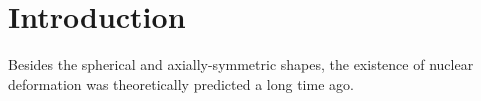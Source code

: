 \chapter{Introduction}

Besides the spherical and axially-symmetric shapes, the existence of nuclear deformation was theoretically predicted a long time ago.
